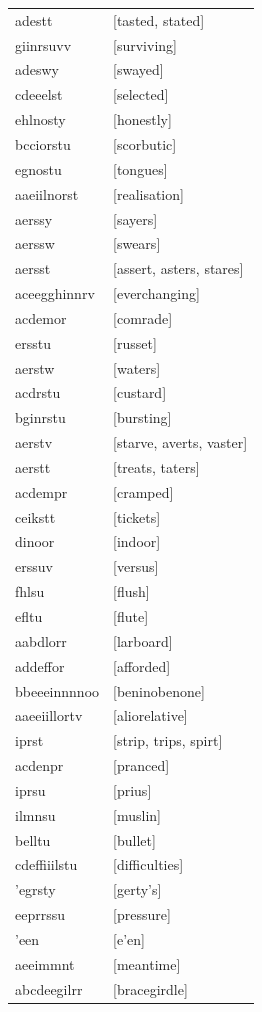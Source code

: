 \documentclass{article}
\begin{document}
\begin{tabular}{ll}
adestt & [tasted, stated] \\
giinrsuvv & [surviving] \\
adeswy & [swayed] \\
cdeeelst & [selected] \\
ehlnosty & [honestly] \\
bcciorstu & [scorbutic] \\
egnostu & [tongues] \\
aaeiilnorst & [realisation] \\
aerssy & [sayers] \\
aerssw & [swears] \\
aersst & [assert, asters, stares] \\
aceegghinnrv & [everchanging] \\
acdemor & [comrade] \\
ersstu & [russet] \\
aerstw & [waters] \\
acdrstu & [custard] \\
bginrstu & [bursting] \\
aerstv & [starve, averts, vaster] \\
aerstt & [treats, taters] \\
acdempr & [cramped] \\
ceikstt & [tickets] \\
dinoor & [indoor] \\
erssuv & [versus] \\
fhlsu & [flush] \\
efltu & [flute] \\
aabdlorr & [larboard] \\
addeffor & [afforded] \\
bbeeeinnnnoo & [beninobenone] \\
aaeeiillortv & [aliorelative] \\
iprst & [strip, trips, spirt] \\
acdenpr & [pranced] \\
iprsu & [prius] \\
ilmnsu & [muslin] \\
belltu & [bullet] \\
cdeffiiilstu & [difficulties] \\
'egrsty & [gerty's] \\
eeprrssu & [pressure] \\
'een & [e'en] \\
aeeimmnt & [meantime] \\
abcdeegilrr & [bracegirdle] \\

\end{tabular}
\end{document}
